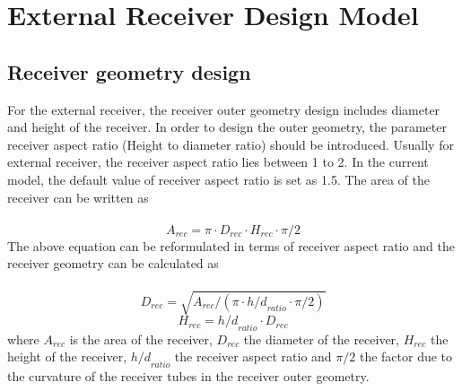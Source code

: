 \section{External Receiver Design Model}
\subsection{Receiver geometry design}
For the external receiver, the receiver outer geometry design includes diameter and height of the receiver. In order to design the outer geometry, the parameter receiver aspect ratio (Height to diameter ratio) should be introduced. Usually for external receiver, the receiver aspect ratio lies between 1 to 2. In the current model, the default value of receiver aspect ratio is set as 1.5. The area of the receiver can be written as \\\\
\begin{equation}
	A_{rec} = \pi \cdot D_{rec} \cdot H_{rec} \cdot \pi / 2
\end{equation}
The above equation can be reformulated in terms of receiver aspect ratio and the receiver geometry can be calculated as\\\\
\begin{equation}
	D_{rec} = \sqrt{A_{rec} / (\pi \cdot {h/d}_{ratio} \cdot \pi / 2)}
\end{equation}
\begin{equation}
	H_{rec} = {h/d}_{ratio} \cdot D_{rec}
\end{equation}
where $A_{rec}$ is the area of the receiver, $D_{rec}$ the diameter of the receiver, $H_{rec}$ the height of the receiver, ${h/d}_{ratio}$ the receiver aspect ratio and $\pi / 2$ the factor due to the curvature of the receiver tubes in the receiver outer geometry.\\\\
